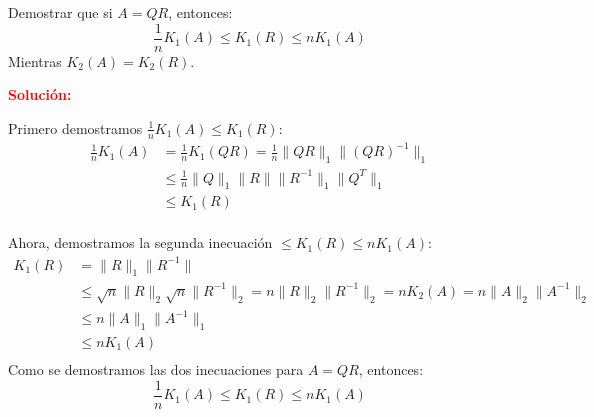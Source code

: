 Demostrar que si $A = QR$, entonces:
\[\frac{1}{n}K_1(A) \leq K_1(R) \leq nK_1(A)\]
Mientras $K_2(A) = K_2(R)$.

\noindent \textcolor{red}{\bf Solución:}

Primero demostramos $\frac{1}{n}K_1(A) \leq K_1(R)$:
\begin{equation*}
    \begin{split}
        \frac{1}{n}K_1(A)   & = \frac{1}{n}K_1(QR) = \frac{1}{n} \|QR\|_1 \|(QR)^{-1}\|_1  \\
                            & \leq \frac{1}{n} \|Q\|_1 \|R\| \|R^{-1}\|_1 \|Q^T\|_1     \\
                            & \leq K_1 (R)                                              \\
    \end{split}
\end{equation*}

Ahora, demostramos la segunda inecuación $\leq K_1(R) \leq nK_1(A)$:
\begin{equation*}
    \begin{split}
        K_1(R)  & = \|R\|_1 \|R^{-1}\|                          \\
                & \leq \sqrt{n} \|R\|_2 \sqrt{n} \|R^{-1}\|_2 = n \|R\|_2 \|R^{-1}\|_2 = n K_2(A) = n \|A\|_2 \|A^{-1}\|_2                      \\
                & \leq n \|A\|_1 \|A^{-1}\|_1                   \\
                & \leq n K_1 (A)                                \\
    \end{split}
\end{equation*}
Como se demostramos las dos inecuaciones para $A=QR$, entonces: 
\begin{equation}
    \frac{1}{n}K_1(A) \leq K_1(R) \leq nK_1(A)
\end{equation}